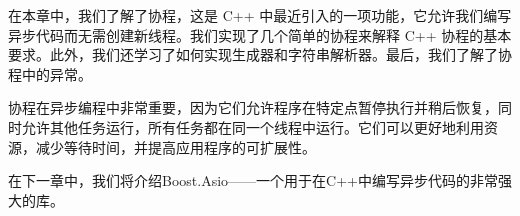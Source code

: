 在本章中，我们了解了协程，这是 C++ 中最近引入的一项功能，它允许我们编写异步代码而无需创建新线程。我们实现了几个简单的协程来解释 C++ 协程的基本要求。此外，我们还学习了如何实现生成器和字符串解析器。最后，我们了解了协程中的异常。

协程在异步编程中非常重要，因为它们允许程序在特定点暂停执行并稍后恢复，同时允许其他任务运行，所有任务都在同一个线程中运行。它们可以更好地利用资源，减少等待时间，并提高应用程序的可扩展性。

在下一章中，我们将介绍Boost.Asio——一个用于在C++中编写异步代码的非常强大的库。